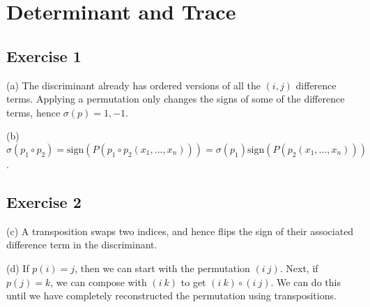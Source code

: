 \section{Determinant and Trace}

\subsection{Exercise 1}
(a) The discriminant already has ordered versions of all the $(i, j)$ difference terms.
Applying a permutation only changes the signs of some of the difference terms, hence
$\sigma(p) = 1, -1$.

(b) $\sigma(p_1 \circ p_2) = \text{sign}(P(p_1 \circ p_2 (x_1, ..., x_n)))  = \sigma(p_1) \text{sign}(P(p_2 (x_1, ..., x_n)))$.

\subsection{Exercise 2}
(c) A transposition swaps two indices, and hence flips the sign of their associated
difference term in the discriminant.

(d) If $p(i) = j$, then we can start with the permutation $(i \: j)$.
Next, if $p(j) = k$, we can compose with  $(i \: k)$ to get $(i \: k) \circ (i \: j)$.
We can do this until we have completely reconstructed the permutation using
transpositions.
